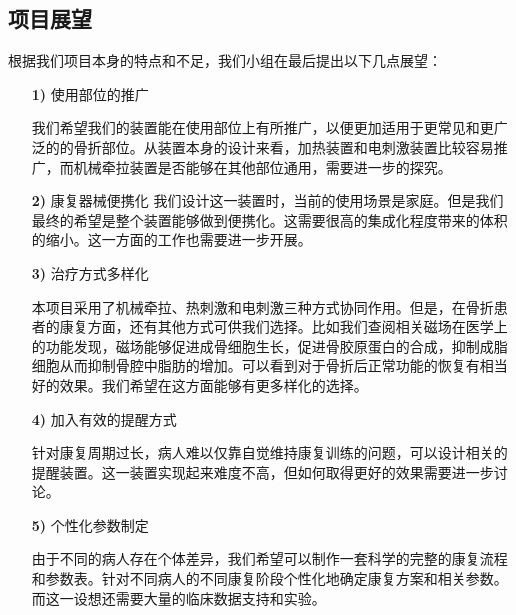 \documentclass[UTF8]{ctexart}
\begin{document}
    \subsection{项目展望}
        根据我们项目本身的特点和不足，我们小组在最后提出以下几点展望：
        \begin{enumerate}
            \item[\textbf{1)}]使用部位的推广
    
                我们希望我们的装置能在使用部位上有所推广，以便更加适用于更常见和更广泛的的骨折部位。从装置本身的设计来看，加热装置和电刺激装置比较容易推广，而机械牵拉装置是否能够在其他部位通用，需要进一步的探究。
            

            \item[\textbf{2)}]康复器械便携化
                我们设计这一装置时，当前的使用场景是家庭。但是我们最终的希望是整个装置能够做到便携化。这需要很高的集成化程度带来的体积的缩小。这一方面的工作也需要进一步开展。 

            \item[\textbf{3)}]治疗方式多样化
            
            本项目采用了机械牵拉、热刺激和电刺激三种方式协同作用。但是，在骨折患者的康复方面，还有其他方式可供我们选择。比如我们查阅相关磁场在医学上的功能发现，磁场能够促进成骨细胞生长，促进骨胶原蛋白的合成，抑制成脂细胞从而抑制骨腔中脂肪的增加。可以看到对于骨折后正常功能的恢复有相当好的效果。我们希望在这方面能够有更多样化的选择。
            

            \item[\textbf{4)}]加入有效的提醒方式
                
                针对康复周期过长，病人难以仅靠自觉维持康复训练的问题，可以设计相关的提醒装置。这一装置实现起来难度不高，但如何取得更好的效果需要进一步讨论。
            
            \item[\textbf{5)}]个性化参数制定
                
                由于不同的病人存在个体差异，我们希望可以制作一套科学的完整的康复流程和参数表。针对不同病人的不同康复阶段个性化地确定康复方案和相关参数。而这一设想还需要大量的临床数据支持和实验。
        \end{enumerate}



    
\end{document}
